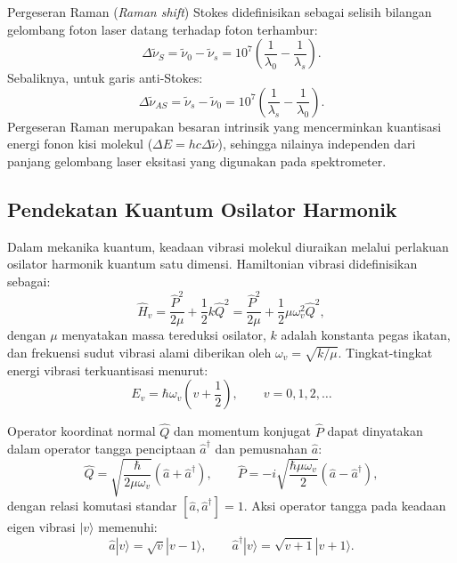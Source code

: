Pergeseran Raman (\textit{Raman shift}) Stokes didefinisikan sebagai selisih bilangan gelombang foton laser datang terhadap foton terhambur:
\begin{equation}
\Delta \tilde{\nu}_S = \tilde{\nu}_0 - \tilde{\nu}_s = 10^7 \left( \frac{1}{\lambda_0} - \frac{1}{\lambda_s} \right).
\label{eq:pergeseran_stokes}
\end{equation}
Sebaliknya, untuk garis anti-Stokes:
\begin{equation}
\Delta \tilde{\nu}_{AS} = \tilde{\nu}_s - \tilde{\nu}_0 = 10^7 \left( \frac{1}{\lambda_s} - \frac{1}{\lambda_0} \right).
\label{eq:pergeseran_antistokes}
\end{equation}
Pergeseran Raman merupakan besaran intrinsik yang mencerminkan kuantisasi energi fonon kisi molekul ($\Delta E = h c \Delta \tilde{\nu}$), sehingga nilainya independen dari panjang gelombang laser eksitasi yang digunakan pada spektrometer.

\subsection{Pendekatan Kuantum Osilator Harmonik}
Dalam mekanika kuantum, keadaan vibrasi molekul diuraikan melalui perlakuan osilator harmonik kuantum satu dimensi. Hamiltonian vibrasi didefinisikan sebagai:
\begin{equation}
\hat{H}_v = \frac{\hat{P}^2}{2\mu} + \frac{1}{2} k \hat{Q}^2 = \frac{\hat{P}^2}{2\mu} + \frac{1}{2} \mu \omega_v^2 \hat{Q}^2,
\label{eq:hamiltonian_harmonik}
\end{equation}
dengan $\mu$ menyatakan massa tereduksi osilator, $k$ adalah konstanta pegas ikatan, dan frekuensi sudut vibrasi alami diberikan oleh $\omega_v = \sqrt{k/\mu}$. Tingkat-tingkat energi vibrasi terkuantisasi menurut:
\begin{equation}
E_v = \hbar \omega_v \left( v + \frac{1}{2} \right), \qquad v = 0, 1, 2, \dots
\label{eq:tingkat_energi}
\end{equation}

Operator koordinat normal $\hat{Q}$ dan momentum konjugat $\hat{P}$ dapat dinyatakan dalam operator tangga penciptaan $\hat{a}^\dagger$ dan pemusnahan $\hat{a}$:
\begin{equation}
\hat{Q} = \sqrt{\frac{\hbar}{2\mu\omega_v}} \left( \hat{a} + \hat{a}^\dagger \right), \qquad
\hat{P} = -i \sqrt{\frac{\hbar\mu\omega_v}{2}} \left( \hat{a} - \hat{a}^\dagger \right),
\label{eq:operator_tangga}
\end{equation}
dengan relasi komutasi standar $[\hat{a}, \hat{a}^\dagger] = 1$. Aksi operator tangga pada keadaan eigen vibrasi $|v\rangle$ memenuhi:
\begin{equation}
\hat{a}|v\rangle = \sqrt{v} |v - 1\rangle, \qquad \hat{a}^\dagger |v\rangle = \sqrt{v + 1} |v + 1\rangle.
\end{equation}

